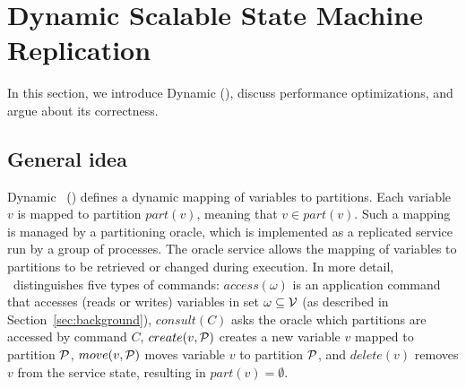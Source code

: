 \section{Dynamic Scalable State Machine Replication}

In this section, we introduce Dynamic \ssmr{} (\dssmr), discuss performance optimizations, and argue about its correctness.

\subsection{General idea}
\label{sec:generalidea}

%

Dynamic \ssmr\ (\dssmr) defines a dynamic mapping of variables to partitions.
Each variable $v$ is mapped to partition $part(v)$, meaning that $v \in part(v)$.
Such a mapping is managed by a partitioning oracle, which is implemented as a replicated service run by a group of processes.
The oracle service allows the mapping of variables to partitions to be retrieved or changed during execution.
In more detail, \dssmr\ distinguishes five types of commands:
$access(\omega)$ is an application command that accesses (reads or writes) variables in set $\omega \subseteq \mathcal{V}$ (as described in Section~\ref{sec:background}),
$consult(C)$ asks the oracle which partitions are accessed by command $C$,
$create(v, \mathcal{P})$ creates a new variable $v$ mapped to partition $\mathcal{P}$,
$move(v,\mathcal{P})$ moves variable $v$ to partition $\mathcal{P}$,
and $delete(v)$ removes $v$ from the service state, resulting in $part(v) = \emptyset$.

